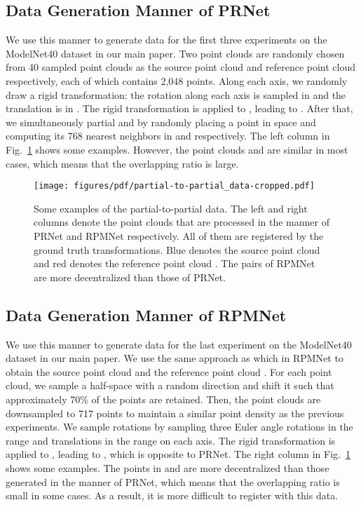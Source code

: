 \documentclass[10pt,twocolumn,letterpaper]{article}
\begin{document}
\subsection{Data Generation Manner of PRNet}
\label{sec:2.1}
We use this manner to generate data for the first three experiments on the ModelNet40 dataset in our main paper. Two point clouds are randomly chosen from 40 sampled point clouds as the source point cloud  and reference point cloud  respectively, each of which contains 2,048 points. Along each axis, we randomly draw a rigid transformation: the rotation along each axis is sampled in  and the translation is in . The rigid transformation is applied to , leading to . After that, we simultaneously partial  and  by randomly placing a point in space and computing its 768 nearest neighbors in  and  respectively. The left column in Fig.~\ref{fig:partial-to-partial data} shows some examples. However, the point clouds  and  are similar in most cases, which means that the overlapping ratio is large.
\begin{figure}[t]
\centering
\texttt{[image: figures/pdf/partial-to-partial\_data-cropped.pdf]}\\
\caption{Some examples of the partial-to-partial data. The left and right columns denote the point clouds that are processed in the manner of PRNet and RPMNet respectively. All of them are registered by the ground truth transformations. Blue denotes the source point cloud  and red denotes the reference point cloud . The pairs of RPMNet are more decentralized than those of PRNet.}
\vspace{-0.37cm}
\label{fig:partial-to-partial data}
\end{figure} \subsection{Data Generation Manner of RPMNet}
\label{sec:2.2}
We use this manner to generate data for the last experiment on the ModelNet40 dataset in our main paper. We use the same approach as which in RPMNet to obtain the source point cloud  and the reference point cloud . For each point cloud, we sample a half-space with a random direction and shift it such that approximately 70\% of the points are retained. Then, the point clouds are downsampled to 717 points to maintain a similar point density as the previous experiments. We sample rotations by sampling three Euler angle rotations in the range  and translations in the range  on each axis. The rigid transformation is applied to , leading to , which is opposite to PRNet. The right column in Fig.~\ref{fig:partial-to-partial data} shows some examples. The points in  and  are more decentralized than those generated in the manner of PRNet, which means that the overlapping ratio is small in some cases. As a result, it is more difficult to register with this data.
\end{document}
